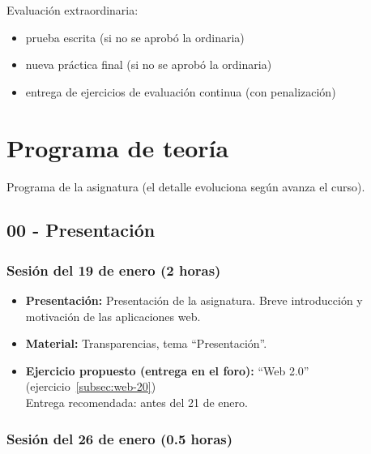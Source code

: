 \documentclass[a4paper,12pt]{article}
\begin{document}
Evaluación extraordinaria:

\begin{itemize}
\item prueba escrita (si no se aprobó la ordinaria)
\item nueva práctica final (si no se aprobó la ordinaria)
\item entrega de ejercicios de evaluación continua (con penalización)
\end{itemize}

\newpage

\section{Programa de teoría}

Programa de la asignatura (el detalle evoluciona según avanza el curso).

\subsection{00 - Presentación}

\subsubsection{Sesión del 19 de enero (2 horas)}

\begin{itemize}
\item \textbf{Presentación:} Presentación de la asignatura. Breve introducción y motivación de las aplicaciones web.
\item \textbf{Material:} Transparencias, tema ``Presentación''.
\item \textbf{Ejercicio propuesto (entrega en el foro):} ``Web 2.0'' (ejercicio~\ref{subsec:web-20}) \\
  Entrega recomendada: antes del 21 de enero.
\end{itemize}

\subsubsection{Sesión del 26 de enero (0.5 horas)}
\end{document}
